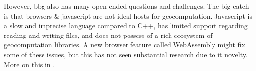 However, \ac{bbg} also has many open-ended questions and challenges. 
The big catch is that browsers \& javascript are not ideal hosts for geocomputation. 
Javascript is a slow and imprecise language compared to C++, has limited support regarding reading and writing files, and does not possess of a rich ecosystem of geocomputation libraries.  
A new browser feature called WebAssembly might fix some of these issues, but this has not seen substantial research due to it novelty. 
More on this in .







